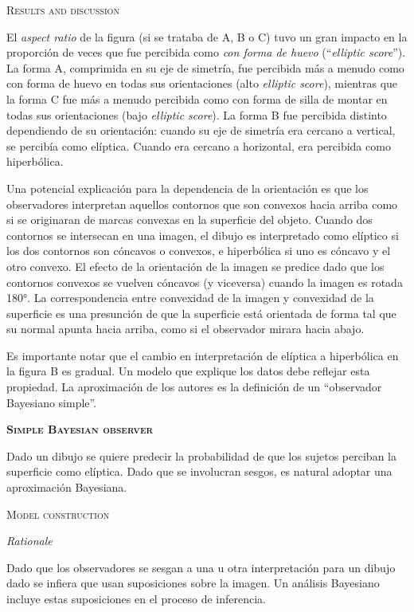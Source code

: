 \documentclass[a4paper,12pt]{article}
\begin{document}
{\scshape Results and discussion}

El {\itshape aspect ratio} de la figura (si se trataba de A, B o C) tuvo un gran impacto en la proporción de veces que fue percibida como {\itshape con forma de huevo} (``{\itshape elliptic score}''). La forma A, comprimida en su eje de simetría, fue percibida más a menudo como con forma de huevo en todas sus orientaciones (alto {\itshape elliptic score}), mientras que la forma C fue más a menudo percibida como con forma de silla de montar en todas sus orientaciones (bajo {\itshape elliptic score}). La forma B fue percibida distinto dependiendo de su orientación: cuando su eje de simetría era cercano a vertical, se percibía como elíptica. Cuando era cercano a horizontal, era percibida como hiperbólica.

Una potencial explicación para la dependencia de la orientación es que los observadores interpretan aquellos contornos que son convexos hacia arriba como si se originaran de marcas convexas en la superficie del objeto. Cuando dos contornos se intersecan en una imagen, el dibujo es interpretado como elíptico si los dos contornos son cóncavos o convexos, e hiperbólica si uno es cóncavo y el otro convexo. El efecto de la orientación de la imagen se predice dado que los contornos convexos se vuelven cóncavos (y viceversa) cuando la imagen es rotada 180°. La correspondencia entre convexidad de la imagen y convexidad de la superficie es una presunción de que la superficie está orientada de forma tal que su normal apunta hacia arriba, como si el observador mirara hacia abajo.

Es importante notar que el cambio en interpretación de elíptica a hiperbólica en la figura B es gradual. Un modelo que explique los datos debe reflejar esta propiedad. La aproximación de los autores es la definición de un ``observador Bayesiano simple''.

{\scshape\bfseries Simple Bayesian observer}

Dado un dibujo se quiere predecir la probabilidad de que los sujetos perciban la superficie como elíptica. Dado que se involucran sesgos, es natural adoptar una aproximación Bayesiana. 

{\scshape Model construction}

{\itshape Rationale}

Dado que los observadores se sesgan a una u otra interpretación para un dibujo dado se infiera que usan suposiciones sobre la imagen. Un análisis Bayesiano incluye estas suposiciones en el proceso de inferencia.
\end{document}
